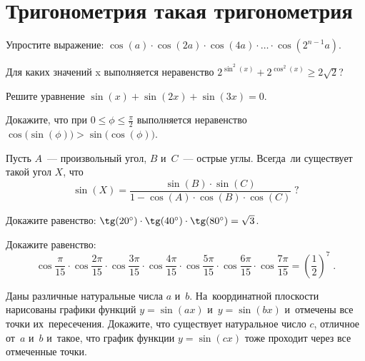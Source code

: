 
\section*{Тригонометрия такая тригонометрия}



\begin{problems}

\item
Упростите выражение:
\(
    \cos (a) \cdot \cos (2 a) \cdot \cos (4 a)
    \cdot \ldots \cdot
    \cos (2^{n - 1} a)
\).

\item
Для каких значений x выполняется неравенство
$2^{\sin^2 (x)} + 2^{\cos^2 (x)} \geq 2 \sqrt{2}$?

\item
Решите уравнение $\sin (x) + \sin (2 x) + \sin (3 x) = 0$.

\item
Докажите, что при $0 \leq \phi \leq \frac{\pi}{2}$ выполняется неравенство
$\cos \bigl( \sin (\phi) \bigr) > \sin \bigl( \cos (\phi) \bigr)$.

\item
Пусть $A$~--- произвольный угол, $B$ и~$C$~--- острые углы.
Всегда~ли существует такой угол $X$, что
\[
    \sin (X)
=
    \frac{
        \sin (B) \cdot \sin (C)
    }{
        1 - \cos (A) \cdot \cos (B) \cdot \cos (C)}
\;?\]

\item
Докажите равенство:
$\tg (20^\circ) \cdot \tg (40^\circ) \cdot \tg (80^\circ) = \sqrt{3}$.

\item
Докажите равенство:
\[
    \cos {\frac{\pi}{15}} \cdot
    \cos {\frac{2 \pi}{15}} \cdot
    \cos {\frac{3 \pi}{15}} \cdot
    \cos {\frac{4 \pi}{15}} \cdot
    \cos {\frac{5 \pi}{15}} \cdot
    \cos {\frac{6 \pi}{15}} \cdot
    \cos {\frac{7 \pi}{15}}
=
    \left( \frac{1}{2} \right)^{7}
\;.\]

\item
Даны различные натуральные числа $a$ и~$b$.
На~координатной плоскости нарисованы графики функций $y = \sin (a x)$
и~$y = \sin (b x)$ и~отмечены все точки их~пересечения.
Докажите, что существует натуральное число $c$, отличное от~$a$ и~$b$ и~такое,
что график функции $y = \sin (c x)$ тоже проходит через все отмеченные точки.

\end{problems}

